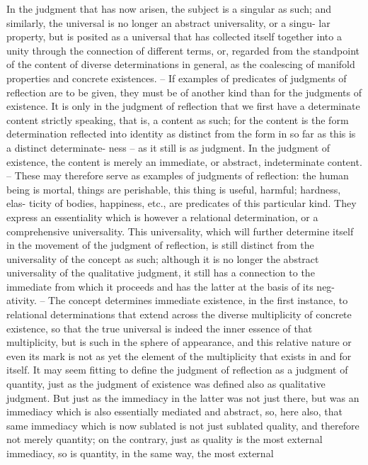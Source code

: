 In the judgment that has now arisen, the subject is a singular as such;
and similarly, the universal is no longer an abstract universality, or a singu-
lar property, but is posited as a universal that has collected itself together
into a unity through the connection of different terms, or, regarded from
the standpoint of the content of diverse determinations in general, as the
coalescing of manifold properties and concrete existences. – If examples
of predicates of judgments of reflection are to be given, they must be of
another kind than for the judgments of existence. It is only in the judgment
of reflection that we first have a determinate content strictly speaking, that is,
a content as such; for the content is the form determination reflected into
identity as distinct from the form in so far as this is a distinct determinate-
ness – as it still is as judgment. In the judgment of existence, the content
is merely an immediate, or abstract, indeterminate content. – These may
therefore serve as examples of judgments of reflection: the human being
is mortal, things are perishable, this thing is useful, harmful; hardness, elas-
ticity of bodies, happiness, etc., are predicates of this particular kind. They
express an essentiality which is however a relational determination, or a
comprehensive universality. This universality, which will further determine
itself in the movement of the judgment of reflection, is still distinct from
the universality of the concept as such; although it is no longer the abstract
universality of the qualitative judgment, it still has a connection to the
immediate from which it proceeds and has the latter at the basis of its neg-
ativity. – The concept determines immediate existence, in the first instance,
to relational determinations that extend across the diverse multiplicity of
concrete existence, so that the true universal is indeed the inner essence of
that multiplicity, but is such in the sphere of appearance, and this relative
nature or even its mark is not as yet the element of the multiplicity that
exists in and for itself.
It may seem fitting to define the judgment of reflection as a judgment of
quantity, just as the judgment of existence was defined also as qualitative
judgment. But just as the immediacy in the latter was not just there, but was
an immediacy which is also essentially mediated and abstract, so, here also,
that same immediacy which is now sublated is not just sublated quality,
and therefore not merely quantity; on the contrary, just as quality is the
most external immediacy, so is quantity, in the same way, the most external
